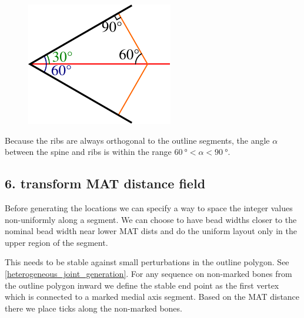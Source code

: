 \begin{figure}
\begin{center}
\includegraphics[width=\linewidth]{sources/method/min_angle_of_introduced_bones.pdf}
\end{center}
\end{figure}

Because the ribs are always orthogonal to the outline segments, the angle $\alpha$ between the spine and ribs is within the range $\SI{60}{\degree} < \alpha < \SI{90}{\degree}$.


\subsection{6. transform MAT distance field}
Before generating the locations we can specify a way to space the integer values non-uniformly along a segment.
We can choose to have bead widths closer to the nominal bead width near lower MAT dists and do the uniform layout only in the upper region of the segment.

This needs to be stable against small perturbations in the outline polygon.
See \cref{heterogeneous_joint_generation}.
For any sequence on non-marked bones from the outline polygon inward we define the stable end point as the first vertex which is connected to a marked medial axis segment.
Based on the MAT distance there we place ticks along the non-marked bones.

